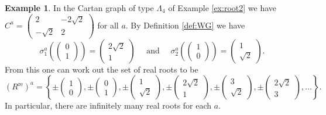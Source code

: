 \documentclass[11pt,a4paper]{amsart}
\theoremstyle{definition}
\newtheorem{Example}[Lemma]{Example}
\numberwithin{equation}{section}
\begin{document}
\begin{Example} \label{ex:root2cont}
In the Cartan graph of type $\Lambda_4$
of Example 
\ref{ex:root2} we have $C^a=\begin{pmatrix}
    2& -2\sqrt{2} \\ -\sqrt{2} & 2 \end{pmatrix}$ for
    all $a$. By Definition \ref{def:WG}
    we have
    $$\sigma_1^a(\begin{pmatrix} 0\\1
    \end{pmatrix} )= \begin{pmatrix}
        2\sqrt{2}\\1 \end{pmatrix}
        \mbox{~~~~and~~~~}
    \sigma_2^a(\begin{pmatrix} 1\\0
    \end{pmatrix} )= \begin{pmatrix}
        1 \\ \sqrt{2} \end{pmatrix}.   
    $$
    From this one can work out the set
    of real roots to be
    $$(R^{\mathrm{re}})^a = 
    \left\{ \pm \begin{pmatrix} 1\\0
    \end{pmatrix}, \pm \begin{pmatrix} 0\\1
    \end{pmatrix}, \pm \begin{pmatrix} 1\\\sqrt{2} \end{pmatrix}, \pm \begin{pmatrix} 2\sqrt{2}\\1
    \end{pmatrix}, \pm \begin{pmatrix} 3\\\sqrt{2} \end{pmatrix},
    \pm \begin{pmatrix} 2\sqrt{2}\\ 3 \end{pmatrix},\ldots
    \right\}.
    $$
    In particular, there are infinitely 
    many real roots for each $a$. 
\end{Example}

\medskip
\end{document}
